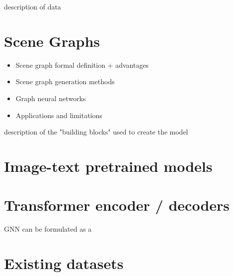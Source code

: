 description of data
\section{Scene Graphs}
\begin{itemize}
    \item Scene graph formal definition + advantages
    \item Scene graph generation methods
    \item Graph neural networks
    \item Applications and limitations
\end{itemize}


description of the "building blocks" used to create the model
\section{Image-text pretrained models}

\section{Transformer encoder / decoders}
GNN can be formulated as a 

\section{Existing datasets}

